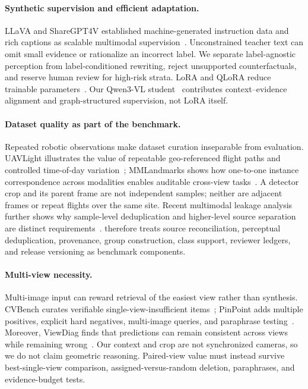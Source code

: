 \paragraph{Synthetic supervision and efficient adaptation.}
LLaVA and ShareGPT4V established machine-generated instruction data and rich captions as scalable multimodal supervision~\cite{liu2023llava,chen2023sharegpt4v}. Unconstrained teacher text can omit small evidence or rationalize an incorrect label. We separate label-agnostic perception from label-conditioned rewriting, reject unsupported counterfactuals, and reserve human review for high-risk strata. LoRA and QLoRA reduce trainable parameters~\cite{hu2022lora,dettmers2023qlora}. Our Qwen3-VL student~\cite{bai2025qwen3vl} contributes context--evidence alignment and graph-structured supervision, not LoRA itself.

\paragraph{Dataset quality as part of the benchmark.}
Repeated robotic observations make dataset curation inseparable from evaluation. UAVLight illustrates the value of repeatable geo-referenced flight paths and controlled time-of-day variation~\cite{du2026uavlight}; MMLandmarks shows how one-to-one instance correspondence across modalities enables auditable cross-view tasks~\cite{kristoffersen2026mmlandmarks}. A detector crop and its parent frame are not independent samples; neither are adjacent frames or repeat flights over the same site. Recent multimodal leakage analysis further shows why sample-level deduplication and higher-level source separation are distinct requirements~\cite{zhang2026leakageaudit}. \dataset therefore treats source reconciliation, perceptual deduplication, provenance, group construction, class support, reviewer ledgers, and release versioning as benchmark components.

\paragraph{Multi-view necessity.}
Multi-image input can reward retrieval of the easiest view rather than synthesis. CVBench curates verifiable single-view-insufficient items~\cite{guo2026cvbench}; PinPoint adds multiple positives, explicit hard negatives, multi-image queries, and paraphrase testing~\cite{mahadev2026pinpoint}. Moreover, ViewDiag finds that predictions can remain consistent across views while remaining wrong~\cite{bhat2026viewdiag}. Our context and crop are not synchronized cameras, so we do not claim geometric reasoning. Paired-view value must instead survive best-single-view comparison, assigned-versus-random deletion, paraphrases, and evidence-budget tests.
